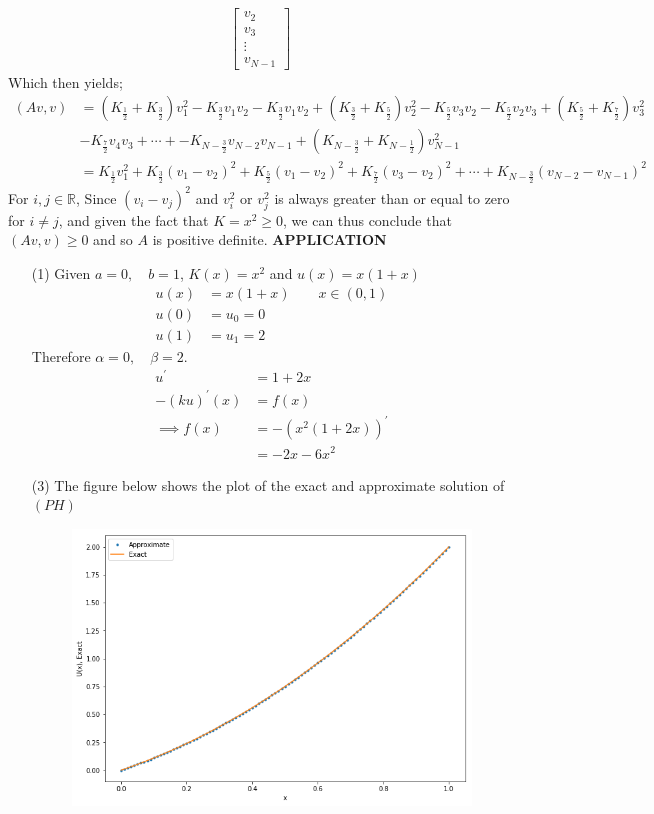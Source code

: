 \documentclass[12pt,a4paper]{article}
\newcommand{\R}{\mathbb{R}}
\begin{document}
\begin{itemize}
\begin{align*}
\begin{bmatrix}
	v_{2}\\
	v_{3}\\
	\vdots\\
	v_{N-1}
	\end{bmatrix}
	\end{align*}
	Which then yields;
	\begin{align*}
	(Av,v)&=(K_{\frac{1}{2}}+K_{\frac{3}{2}})v_{1}^{2}-K_{\frac{3}{2}}v_{1}v_{2}-K_{\frac{3}{2}}v_{1}v_{2}+(K_{\frac{3}{2}}+K_{\frac{5}{2}})v_{2}^{2}-K_{\frac{5}{2}}v_{3}v_{2}-K_{\frac{5}{2}}v_{2}v_{3}+(K_{\frac{5}{2}}+K_{\frac{7}{2}})v_{3}^{2}\\
	&-K_{\frac{7}{2}}v_{4}v_{3}+\cdots+-K_{N-\frac{3}{2}}v_{N-2}v_{N-1}+(K_{N-\frac{3}{2}}+K_{N-\frac{1}{2}})v_{N-1}^{2}\\
	&=K_{\frac{1}{2}}v_{1}^{2}+K_{\frac{3}{2}}(v_{1}-v_{2})^{2}+K_{\frac{5}{2}}(v_{1}-v_{2})^{2}+K_{\frac{7}{2}}(v_{3}-v_{2})^{2}+\cdots+K_{N-\frac{3}{2}}(v_{N-2}-v_{N-1})^{2}
	\end{align*}
	For  $i,j \in \R$, Since $(v_{i}-v_{j})^{2}$ and $v_{i}^{2}$ or $v_{j}^{2}$ is always greater than or equal to zero for $i\neq j$, and given the fact that $K=x^{2}\geq0$, we can thus conclude that $(Av,v)\geq0$ and so $A$ is positive definite. 
	\newpage
	\textbf{APPLICATION}
	\begin{itemize}
		\item [(1)] Given $a=0, \quad b=1$, $K(x)=x^{2}$ and $u(x)=x(1+x)$
		\begin{align*}
		u(x)&=x(1+x)   \quad \quad x\in(0,1)\\
		u(0)&=u_{0}=0\\
		u(1)&=u_{1}=2
		\end{align*}
		Therefore $\alpha=0,\quad \beta=2.$
		\begin{align*}
		u^{\prime}&=1+2x\\
		-(ku)^{\prime}(x)&=f(x)\\
		\implies f(x)&= -(x^{2}(1+2x))^{\prime} \\
		&=-2x-6x^{2}
		\end{align*}
		\item[(3)]The figure below shows the plot of the exact and approximate solution of $(PH)$
		\begin{figure}[h!]
			\centering
			\includegraphics[scale=0.5]{1.png}

\end{figure}
\end{itemize}
\end{itemize}
\end{document}
